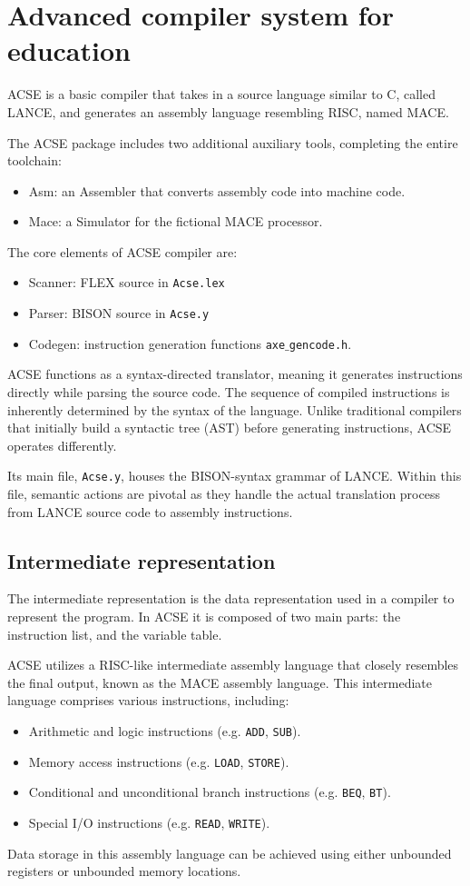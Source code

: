 \section{Advanced compiler system for education}

ACSE is a basic compiler that takes in a source language similar to C, called LANCE, and generates an assembly language resembling RISC, named MACE.

The ACSE package includes two additional auxiliary tools, completing the entire toolchain:
\begin{itemize}
    \item Asm: an Assembler that converts assembly code into machine code.
    \item Mace: a Simulator for the fictional MACE processor.
\end{itemize}

The core elements of ACSE compiler are:
\begin{itemize}
    \item Scanner: FLEX source in \texttt{Acse.lex}
    \item Parser: BISON source in \texttt{Acse.y}
    \item Codegen: instruction generation functions \texttt{axe$\_$gencode.h}.
\end{itemize}
ACSE functions as a syntax-directed translator, meaning it generates instructions directly while parsing the source code. 
The sequence of compiled instructions is inherently determined by the syntax of the language. 
Unlike traditional compilers that initially build a syntactic tree (AST) before generating instructions, ACSE operates differently. 

Its main file, \texttt{Acse.y}, houses the BISON-syntax grammar of LANCE. 
Within this file, semantic actions are pivotal as they handle the actual translation process from LANCE source code to assembly instructions.

\subsection{Intermediate representation}
The intermediate representation is the data representation used in a compiler to represent the program.
In ACSE it is composed of two main parts: the instruction list, and the variable table. 

ACSE utilizes a RISC-like intermediate assembly language that closely resembles the final output, known as the MACE assembly language. 
This intermediate language comprises various instructions, including:
\begin{itemize}
    \item Arithmetic and logic instructions (e.g. \texttt{ADD}, \texttt{SUB}).
    \item Memory access instructions (e.g. \texttt{LOAD}, \texttt{STORE}).
    \item Conditional and unconditional branch instructions (e.g. \texttt{BEQ}, \texttt{BT}).
    \item Special I/O instructions (e.g. \texttt{READ}, \texttt{WRITE}).
\end{itemize}
Data storage in this assembly language can be achieved using either unbounded registers or unbounded memory locations.

